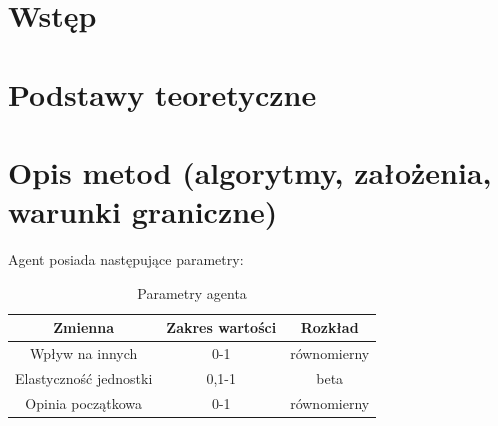 \documentclass{wfiisul}
\begin{document}





\stronatytulowa



\chapter{Wstęp}




\chapter{Podstawy teoretyczne}









\chapter{Opis metod (algorytmy, założenia, warunki graniczne)}

Agent posiada następujące parametry:

\begin{table}[htbp]
  \centering
  \begin{tabular}{c|c|c}
    \hline
    Zmienna                & Zakres wartości & Rozkład     \\
    \hline
    Wpływ na innych        & 0-1             & równomierny \\
    Elastyczność jednostki & 0,1-1           & beta        \\
    Opinia początkowa      & 0-1             & równomierny \\
  \end{tabular}
  \caption{Parametry agenta}
  \label{tab:agent_parameters}
\end{table}
\end{document}
